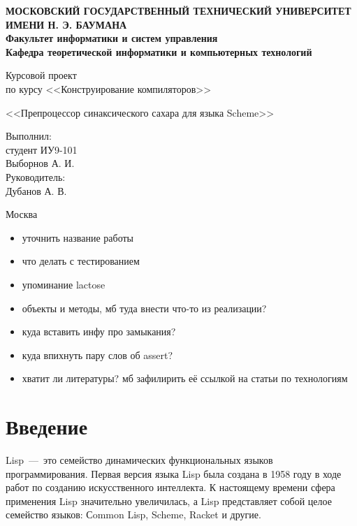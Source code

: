\documentclass[12pt,a4paper,oneside]{extarticle}
\begin{document}
\pgfplotsset{compat=1.8}

\thispagestyle{empty}
\newpage
{
\centering


\textbf{
МОСКОВСКИЙ ГОСУДАРСТВЕННЫЙ ТЕХНИЧЕСКИЙ УНИВЕРСИТЕТ ИМЕНИ Н. Э. БАУМАНА \\
Факультет информатики и систем управления \\
Кафедра теоретической информатики и компьютерных технологий}
\bigskip
\bigskip
\bigskip
\bigskip
\bigskip
\bigskip
\bigskip

\vfill


Курсовой проект \\
по курсу <<Конструирование компиляторов>>

\bigskip

{\large <<Препроцессор синаксического сахара для языка Scheme>>}
\bigskip

\vfill



\hfill\parbox{4cm} {
Выполнил:\\
студент ИУ9-101 \hfill \\
Выборнов А. И.\hfill \medskip\\
Руководитель:\\
Дубанов А. В.\hfill
}


\vspace{\fill}

Москва \number\year
\clearpage
}


\tableofcontents

\clearpage

\begin{itemize}
    \item уточнить название работы
    \item что делать с тестированием
    \item упоминание lactose
    \item объекты и методы, мб туда внести что-то из реализации?
    \item куда вставить инфу про замыкания?
    \item куда впихнуть пару слов об assert?
    \item хватит ли литературы? мб зафилирить её ссылкой на статьи по технологиям
\end{itemize}

\clearpage

\section*{Введение}
    Lisp~---~это семейство динамических функциональных языков программирования.
    Первая версия языка Lisp была создана в 1958 году в ходе работ по созданию искусственного интеллекта.
    К настоящему времени сфера применения Lisp значительно увеличилась, а Lisp представляет собой целое семейство языков: Сommon Lisp, Scheme, Racket и другие. 
\end{document}
